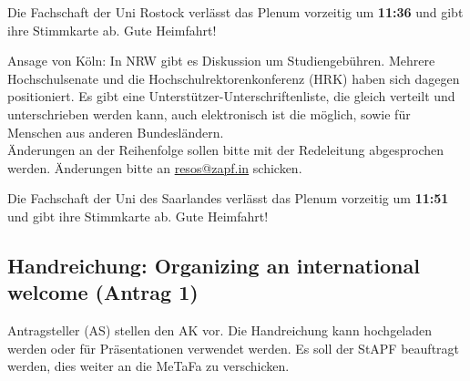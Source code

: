     \begin{info}{}
      Die Fachschaft der Uni Rostock verlässt das Plenum vorzeitig um \textbf{11:36} und gibt ihre Stimmkarte ab. Gute Heimfahrt!
    \end{info}

    Ansage von Köln: In NRW gibt es Diskussion um Studiengebühren. Mehrere Hochschulsenate und die Hochschulrektorenkonferenz (HRK) haben sich dagegen positioniert. Es gibt eine Unterstützer-Unterschriftenliste, die gleich verteilt und unterschrieben werden kann, auch elektronisch ist die möglich, sowie für Menschen aus anderen Bundesländern. \\

    Änderungen an der Reihenfolge sollen bitte mit der Redeleitung abgesprochen werden. Änderungen bitte an \url{resos@zapf.in} schicken.

    \begin{info}{}
      Die Fachschaft der Uni des Saarlandes verlässt das Plenum vorzeitig um \textbf{11:51} und gibt ihre Stimmkarte ab. Gute Heimfahrt!
    \end{info}

  \subsection*{Handreichung: Organizing an international welcome (Antrag 1)}
    Antragsteller (AS) stellen den AK vor. Die Handreichung kann hochgeladen werden oder für Präsentationen verwendet werden. Es soll der StAPF beauftragt werden, dies weiter an die MeTaFa zu verschicken.


